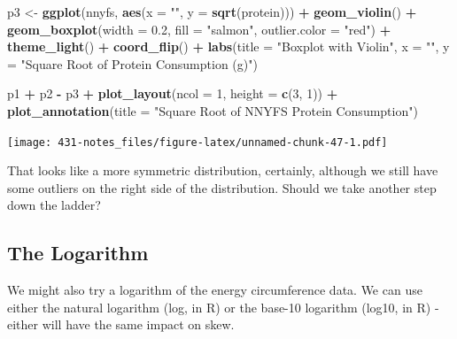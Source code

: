 \documentclass[
]{book}
\newenvironment{Shaded}{\begin{snugshade}}{\end{snugshade}}
\newcommand{\DataTypeTok}[1]{\textcolor[rgb]{0.13,0.29,0.53}{#1}}
\newcommand{\DecValTok}[1]{\textcolor[rgb]{0.00,0.00,0.81}{#1}}
\newcommand{\FloatTok}[1]{\textcolor[rgb]{0.00,0.00,0.81}{#1}}
\newcommand{\KeywordTok}[1]{\textcolor[rgb]{0.13,0.29,0.53}{\textbf{#1}}}
\newcommand{\NormalTok}[1]{#1}
\newcommand{\OperatorTok}[1]{\textcolor[rgb]{0.81,0.36,0.00}{\textbf{#1}}}
\newcommand{\StringTok}[1]{\textcolor[rgb]{0.31,0.60,0.02}{#1}}
\begin{document}
\begin{Shaded}
\begin{Highlighting}[]
\NormalTok{p3 <-}\StringTok{ }\KeywordTok{ggplot}\NormalTok{(nnyfs, }\KeywordTok{aes}\NormalTok{(}\DataTypeTok{x =} \StringTok{""}\NormalTok{, }\DataTypeTok{y =} \KeywordTok{sqrt}\NormalTok{(protein))) }\OperatorTok{+}
\StringTok{    }\KeywordTok{geom_violin}\NormalTok{() }\OperatorTok{+}
\StringTok{    }\KeywordTok{geom_boxplot}\NormalTok{(}\DataTypeTok{width =} \FloatTok{0.2}\NormalTok{, }\DataTypeTok{fill =} \StringTok{"salmon"}\NormalTok{, }
                 \DataTypeTok{outlier.color =} \StringTok{"red"}\NormalTok{) }\OperatorTok{+}
\StringTok{    }\KeywordTok{theme_light}\NormalTok{() }\OperatorTok{+}
\StringTok{    }\KeywordTok{coord_flip}\NormalTok{() }\OperatorTok{+}
\StringTok{    }\KeywordTok{labs}\NormalTok{(}\DataTypeTok{title =} \StringTok{"Boxplot with Violin"}\NormalTok{,}
         \DataTypeTok{x =} \StringTok{""}\NormalTok{, }\DataTypeTok{y =} \StringTok{"Square Root of Protein Consumption (g)"}\NormalTok{)}

\NormalTok{p1 }\OperatorTok{+}\StringTok{ }\NormalTok{p2 }\OperatorTok{-}\StringTok{ }\NormalTok{p3 }\OperatorTok{+}\StringTok{ }\KeywordTok{plot_layout}\NormalTok{(}\DataTypeTok{ncol =} \DecValTok{1}\NormalTok{, }\DataTypeTok{height =} \KeywordTok{c}\NormalTok{(}\DecValTok{3}\NormalTok{, }\DecValTok{1}\NormalTok{)) }\OperatorTok{+}
\StringTok{    }\KeywordTok{plot_annotation}\NormalTok{(}\DataTypeTok{title =} \StringTok{"Square Root of NNYFS Protein Consumption"}\NormalTok{)}
\end{Highlighting}
\end{Shaded}

\texttt{[image: 431-notes\_files/figure-latex/unnamed-chunk-47-1.pdf]}

That looks like a more symmetric distribution, certainly, although we still have some outliers on the right side of the distribution. Should we take another step down the ladder?

\hypertarget{the-logarithm}{%
\subsection{The Logarithm}\label{the-logarithm}}

We might also try a logarithm of the energy circumference data. We can use either the natural logarithm (log, in R) or the base-10 logarithm (log10, in R) - either will have the same impact on skew.
\end{document}
